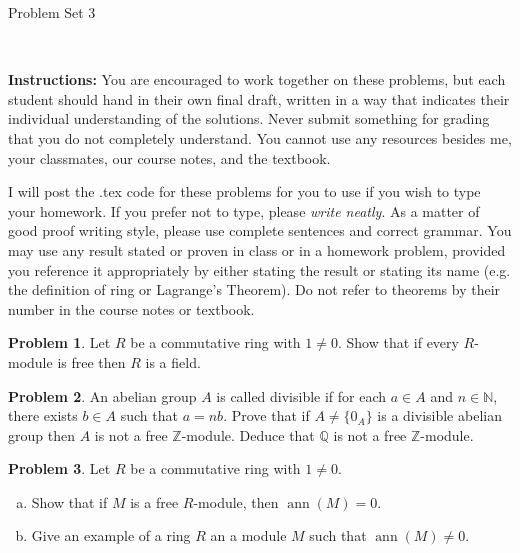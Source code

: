 \documentclass[11pt]{article}
\title{}
\date{\vspace{-0.5in}}
\DeclareMathOperator{\ann}{ann}
\newcommand{\Q}{\mathbb{Q}}
\newcommand{\Z}{\mathbb{Z}}
\newcommand{\N}{\mathbb{N}}
\theoremstyle{definition}
\newtheorem{problem}{Problem}
\begin{document}
\thispagestyle{fancy}
\pagestyle{fancy}

\vspace{3em}

\begin{center}
	{\LARGE Problem Set 3}
\end{center}

\

\noindent
{\bf Instructions:}
You are encouraged to work together on these problems, but each student should hand in their own final draft, written in a way that indicates their individual understanding of the solutions. Never submit something for grading that you do not completely understand. You cannot use any resources besides me, your classmates, our course notes, and the textbook.


I will post the .tex code for these problems for you to use if you wish to type your homework. If you prefer not to type, please  {\em write neatly}. As a matter of good proof writing style, please use complete sentences and correct grammar. You may use any result  stated or proven in class or in a homework problem, provided you reference it appropriately by either stating the result or stating its name (e.g. the definition of ring or Lagrange's Theorem). Do not refer to theorems by their number in the course notes or textbook.


\vspace{2em}




\begin{problem}
	Let $R$ be a commutative ring with $1 \neq 0$. Show that if every $R$-module is free then $R$ is a field.
\end{problem}

\begin{problem}
An abelian group $A$ is called divisible if for each $a \in A$ and $n \in \N$, there exists $b \in A$ such that $a = nb$. Prove that if $A \neq\{0_A\}$ is a divisible abelian group then $A$ is not a free $\Z$-module. Deduce that $\Q$ is not a free $\Z$-module.
\end{problem}



\begin{problem}
	Let $R$ be a commutative ring with $1 \neq 0$.
	\begin{enumerate}[a)]
		\item Show that if $M$ is a free $R$-module, then $\ann(M) = 0$.
		\item Give an example of a ring $R$ an a module $M$ such that $\ann(M) \neq 0$.
	\end{enumerate}
\end{problem}
\end{document}
